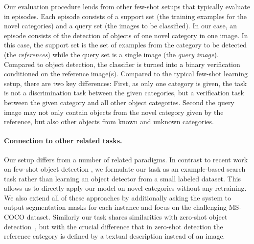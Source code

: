 \documentclass{article}
\newcommand{\coco}{MS-COCO\xspace}
\begin{document}
Our evaluation procedure lends from other few-shot setups that typically evaluate in episodes. Each episode consists of a support set (the training examples for the novel categories) and a query set (the images to be classified). In our case, an episode consists of the detection of objects of one novel category in one image. In this case, the support set is the set of examples from the category to be detected (the \emph{references}) while the query set is a single image (the \emph{query image}).
Compared to object detection, the classifier is turned into a binary verification conditioned on the reference image(s). Compared to the typical few-shot learning setup, there are two key differences: First, as only one category is given, the task is not a discrimination task between the given categories, but a verification task between the given category and all other object categories. Second the query image may not only contain objects from the novel category given by the reference, but also other objects from known and unknown categories.


\paragraph{Connection to other related tasks.} 

Our setup differs from a number of related paradigms. In contrast to recent work on few-shot object detection \cite{Dong2018, Chen2018, kang2018few, Schwartz2018a}, we formulate our task as an example-based search task rather than learning an object detector from a small labeled dataset. This allows us to directly apply our model on novel categories without any retraining. We also extend all of these approaches by additionally asking the system to output segmentation masks for each instance and focus on the challenging \coco dataset. Similarly our task shares similarities with zero-shot object detection~\cite{Bansal2018, Rahman2018, Demirel2018, zhu2019}, but with the crucial difference that in zero-shot detection the reference category is defined by a textual description instead of an image.
\end{document}

